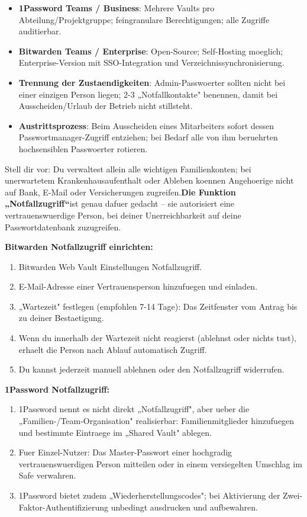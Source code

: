 \begin{itemize}
  \item \textbf{1Password Teams / Business}: Mehrere Vaults pro Abteilung/Projektgruppe; feingranulare Berechtigungen; alle Zugriffe auditierbar.
  \item \textbf{Bitwarden Teams / Enterprise}: Open-Source; Self-Hosting moeglich; Enterprise-Version mit SSO-Integration und Verzeichnissynchronisierung.
  \item \textbf{Trennung der Zustaendigkeiten}: Admin-Passwoerter sollten nicht bei einer einzigen Person liegen; 2-3 „Notfallkontakte" benennen, damit bei Ausscheiden/Urlaub der Betrieb nicht stillsteht.
  \item \textbf{Austrittsprozess}: Beim Ausscheiden eines Mitarbeiters sofort dessen Passwortmanager-Zugriff entziehen; bei Bedarf alle von ihm beruehrten hochsensiblen Passwoerter rotieren.
\end{itemize}


Stell dir vor: Du verwaltest allein alle wichtigen Familienkonten; bei unerwartetem Krankenhausaufenthalt oder Ableben koennen Angehoerige nicht auf Bank, E-Mail oder Versicherungen zugreifen.\textbf{Die Funktion „Notfallzugriff“}ist genau dafuer gedacht – sie autorisiert eine vertrauenswuerdige Person, bei deiner Unerreichbarkeit auf deine Passwortdatenbank zuzugreifen.

\textbf{Bitwarden Notfallzugriff einrichten:}

\begin{enumerate}
  \item Bitwarden Web Vault Einstellungen Notfallzugriff.
  \item E-Mail-Adresse einer Vertrauensperson hinzufuegen und einladen.
  \item „Wartezeit" festlegen (empfohlen 7-14 Tage): Das Zeitfenster vom Antrag bis zu deiner Bestaetigung.
  \item Wenn du innerhalb der Wartezeit nicht reagierst (ablehnst oder nichts tust), erhaelt die Person nach Ablauf automatisch Zugriff.
  \item Du kannst jederzeit manuell ablehnen oder den Notfallzugriff widerrufen.
\end{enumerate}

\textbf{1Password Notfallzugriff:}

\begin{enumerate}
  \item 1Password nennt es nicht direkt „Notfallzugriff", aber ueber die „Familien-/Team-Organisation" realisierbar: Familienmitglieder hinzufuegen und bestimmte Eintraege im „Shared Vault" ablegen.
  \item Fuer Einzel-Nutzer: Das Master-Passwort einer hochgradig vertrauenswuerdigen Person mitteilen oder in einem versiegelten Umschlag im Safe verwahren.
  \item 1Password bietet zudem „Wiederherstellungscodes"; bei Aktivierung der Zwei-Faktor-Authentifizierung unbedingt ausdrucken und aufbewahren.
\end{enumerate}

